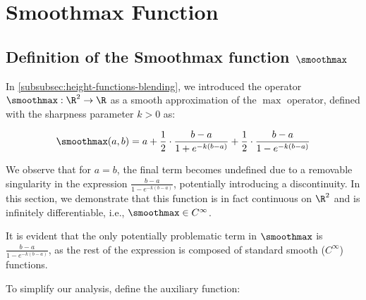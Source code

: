\graphicspath{{"Appendix/figures/Smoothmax"}}

\chapter{Smoothmax Function}
\label{chap:smoothmax-proof}


\section{Definition of the Smoothmax function $\smoothmax$}

In \cref{subsubsec:height-functions-blending}, we introduced the operator $\smoothmax: \R^2 \to \R$ as a smooth approximation of the $\max$ operator, defined with the sharpness parameter $k > 0$ as:

\begin{align}
    \smoothmax(a, b) = a + \frac{1}{2} \cdot \frac{b - a}{1 + e^{-k(b - a)}} + \frac{1}{2} \cdot \frac{b - a}{1 - e^{-k(b - a)}}
\end{align}

We observe that for $a = b$, the final term becomes undefined due to a removable singularity in the expression $\frac{b - a}{1 - e^{-k(b - a)}}$, potentially introducing a discontinuity. In this section, we demonstrate that this function is in fact continuous on $\R^2$ and is infinitely differentiable, i.e., $\smoothmax \in C^\infty$.

It is evident that the only potentially problematic term in $\smoothmax$ is $\frac{b - a}{1 - e^{-k(b - a)}}$, as the rest of the expression is composed of standard smooth ($C^\infty$) functions.

To simplify our analysis, define the auxiliary function:


